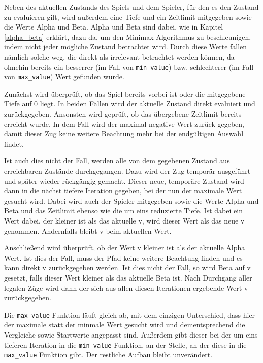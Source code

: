     Neben des aktuellen Zustands des Spiels und dem Spieler,
für den es den Zustand zu evaluieren gilt, wird außerdem eine Tiefe
und ein Zeitlimit mitgegeben sowie die Werte Alpha und Beta. Alpha und
Beta sind dabei, wie in Kapitel \ref{alpha_beta} erklärt, dazu da, um den
Minimax-Algorithmus zu beschleunigen, indem nicht jeder mögliche Zustand
betrachtet wird. Durch diese Werte fallen nämlich solche weg, die direkt
als irrelevant betrachtet werden können, da ohnehin bereits ein
besserrer (im Fall von \texttt{min\_value}) bzw. schlechterer (im Fall
von \texttt{max\_value}) Wert gefunden wurde.

Zunächst wird überprüft, ob das Spiel bereits vorbei ist oder die mitgegebene Tiefe auf 0 liegt. 
In beiden Fällen wird der aktuelle Zustand direkt evaluiert und zurückgegeben. Ansonsten 
wird geprüft, ob das übergebene Zeitlimit bereits erreicht wurde. In dem Fall wird der
maximal negative Wert zurück gegeben, damit dieser Zug keine weitere Beachtung 
mehr bei der endgültigen Auswahl findet.

Ist auch dies nicht der Fall, werden alle von dem gegebenen Zustand aus 
erreichbaren Zustände durchgegangen. Dazu wird der Zug temporär ausgeführt 
und später wieder rückgängig gemacht. Dieser neue, temporäre Zustand wird 
dann in die nächst tiefere Iteration gegeben, bei der nun der maximale Wert 
gesucht wird. Dabei wird auch der Spieler mitgegeben sowie die Werte Alpha 
und Beta und das Zeitlimit ebenso wie die um eins reduzierte Tiefe.
Ist dabei ein Wert dabei, der kleiner ist als das aktuelle v, wird dieser Wert als
das neue v genommen. Andernfalls bleibt v beim aktuellen Wert.

Anschließend wird überprüft, ob der Wert v kleiner ist als der aktuelle
Alpha Wert. Ist dies der Fall, muss der Pfad keine weitere Beachtung
finden und es kann direkt v zurückgegeben werden. Ist dies nicht der
Fall, so wird Beta auf v gesetzt, falls dieser Wert kleiner als das
aktuelle Beta ist. Nach Durchgang aller legalen Züge wird dann der sich
aus allen diesen Iterationen ergebende Wert v zurückgegeben.

Die \texttt{max\_value} Funktion läuft gleich ab, mit dem einzigen
Unterschied, dass hier der maximale statt der minmale Wert gesucht wird
und dementsprechend die Vergleiche sowie Startwerte angepasst sind.
Außerdem gibt dieser bei der um eins tieferen Iteration in die
\texttt{min\_value} Funktion, an der Stelle, an der diese in die
\texttt{max\_value} Funktion gibt. Der restliche Aufbau bleibt
unverändert.

